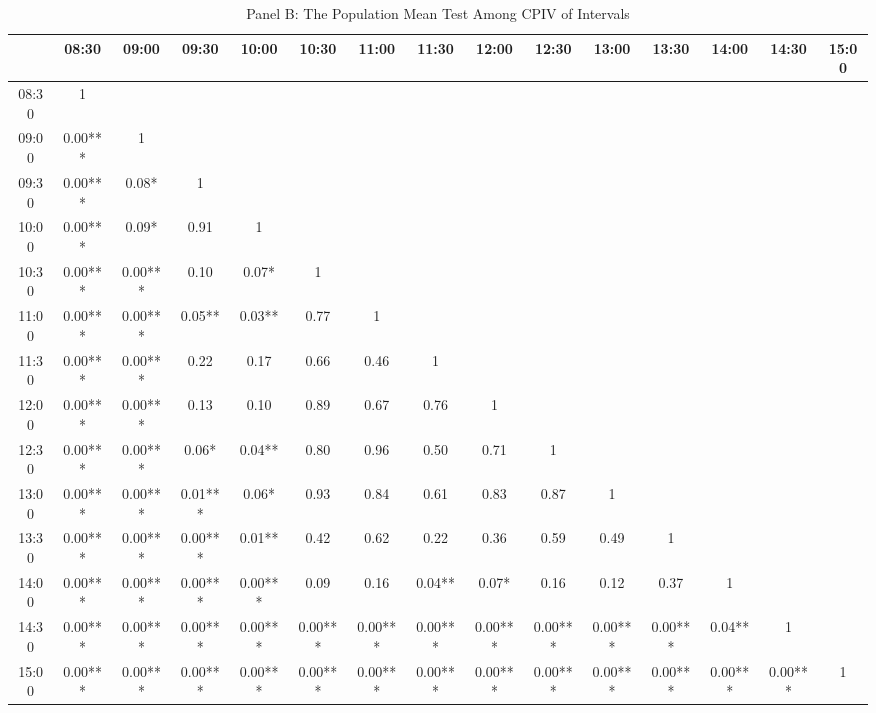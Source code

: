 \begin{table}[h]
\begin{threeparttable}
\medskip

\begin{subtable}[t]{\linewidth}

\caption{Panel B: The Population Mean Test Among CPIV of Intervals}
\tiny

\begin{tabular}{|c|cccccccccccccc}
\toprule

& 08:30   & 09:00   & 09:30   & 10:00   & 10:30   & 11:00   & 11:30   & 12:00   & 12:30   & 13:00   & 13:30   & 14:00  & 14:30 & 15:00 \\ \midrule
08:30 & 1       &         &         &         &         &         &         &         &         &         &         &        &       &       \\
09:00 & 0.00*** & 1       &         &         &         &         &         &         &         &         &         &        &       &       \\
09:30 & 0.00*** & 0.08*   & 1       &         &         &         &         &         &         &         &         &        &       &       \\
10:00 & 0.00*** & 0.09*   & 0.91    & 1       &         &         &         &         &         &         &         &        &       &       \\
10:30 & 0.00*** & 0.00*** & 0.10    & 0.07*   & 1       &         &         &         &         &         &         &        &       &       \\
11:00 & 0.00*** & 0.00*** & 0.05**  & 0.03**  & 0.77    & 1       &         &         &         &         &         &        &       &       \\
11:30 & 0.00*** & 0.00*** & 0.22    & 0.17    & 0.66    & 0.46    & 1       &         &         &         &         &        &       &       \\
12:00 & 0.00*** & 0.00*** & 0.13    & 0.10    & 0.89    & 0.67    & 0.76    & 1       &         &         &         &        &       &       \\
12:30 & 0.00*** & 0.00*** & 0.06*   & 0.04**  & 0.80    & 0.96    & 0.50    & 0.71    & 1       &         &         &        &       &       \\
13:00 & 0.00*** & 0.00*** & 0.01*** & 0.06*   & 0.93    & 0.84    & 0.61    & 0.83    & 0.87    & 1       &         &        &       &       \\
13:30 & 0.00*** & 0.00*** & 0.00*** & 0.01**  & 0.42    & 0.62    & 0.22    & 0.36    & 0.59    & 0.49    & 1       &        &       &       \\
14:00 & 0.00*** & 0.00*** & 0.00*** & 0.00*** & 0.09    & 0.16    & 0.04**  & 0.07*   & 0.16    & 0.12    & 0.37    & 1      &       &       \\
14:30 & 0.00*** & 0.00*** & 0.00*** & 0.00*** & 0.00*** & 0.00*** & 0.00*** & 0.00*** & 0.00*** & 0.00*** & 0.00*** & 0.04** & 1     &       \\
15:00 & 0.00*** & 0.00*** & 0.00*** & 0.00*** & 0.00*** & 0.00*** & 0.00*** & 0.00*** & 0.00*** & 0.00*** & 0.00*** & 0.00*** & 0.00***& 1   \\
\bottomrule


\end{tabular}
\end{subtable}
\end{threeparttable}
\end{table}
